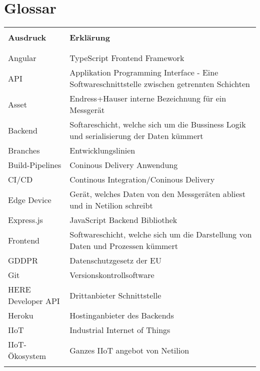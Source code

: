 \chapter{Glossar}
\begin{table}[H]
  \begin{tabularx}{\textwidth}{l X}\hline \\
  \textbf{Ausdruck} & \textbf{Erklärung}  \\ \\\hline \\
  Angular & TypeScript Frontend Framework \\
  API & Applikation Programming Interface - Eine Softwareschnittstelle zwischen getrennten Schichten \\
  Asset & Endress+Hauser interne Bezeichnung für ein Messgerät \\
  Backend & Softareschicht, welche sich um die Bussiness Logik und serialisierung der Daten kümmert \\
  Branches & Entwicklungslinien \\
  Build-Pipelines & Coninous Delivery Anwendung \\
  CI/CD & Continous Integration/Coninous Delivery \\
  Edge Device & Gerät, welches Daten von den Messgeräten abliest und in Netilion schreibt \\
  Express.js & JavaScript Backend Bibliothek \\
  Frontend & Softwareschicht, welche sich um die Darstellung von Daten und Prozessen kümmert \\
  GDDPR & Datenschutzgesetz der EU \\
  Git & Versionskontrollsoftware \\
  HERE Developer API & Drittanbieter Schnittstelle \\
  Heroku & Hostinganbieter des Backends \\
  IIoT & Industrial Internet of Things \\
  IIoT-Ökosystem & Ganzes IIoT angebot von Netilion \\

  \\\hline
  \end{tabularx}
\end{table}
\pagebreak
